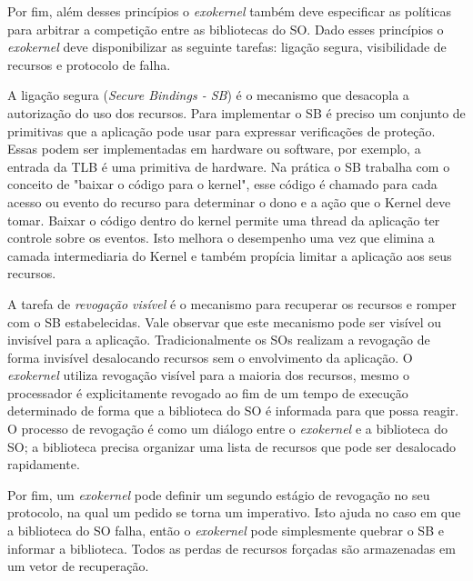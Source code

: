 Por fim, além desses princípios o \emph{exokernel} também deve especificar as
políticas para arbitrar a competição entre as bibliotecas do SO. Dado esses
princípios o \emph{exokernel} deve disponibilizar as seguinte tarefas: ligação
segura, visibilidade de recursos e protocolo de falha.

A ligação segura (\emph{Secure Bindings - SB}) é o mecanismo que desacopla a
autorização do uso dos recursos. Para implementar o SB é preciso um conjunto de
primitivas que a aplicação pode usar para expressar verificações de proteção.
Essas podem ser implementadas em hardware ou software, por exemplo, a entrada
da TLB é uma primitiva de hardware. Na prática o SB trabalha com o conceito de
"baixar o código para o kernel", esse código é chamado para cada acesso ou
evento do recurso para determinar o dono e a ação que o Kernel deve tomar.
Baixar o código dentro do kernel permite uma thread da aplicação ter controle
sobre os eventos. Isto melhora o desempenho uma vez que elimina a camada
intermediaria do Kernel e também propícia limitar a aplicação aos seus
recursos.

A tarefa de \emph{revogação visível} é o mecanismo para recuperar os recursos
e romper com o SB estabelecidas. Vale observar que este mecanismo pode ser
visível ou invisível para a aplicação. Tradicionalmente os SOs realizam a
revogação de forma invisível desalocando recursos sem o envolvimento da
aplicação. O \emph{exokernel} utiliza revogação visível para a maioria dos
recursos, mesmo o processador é explicitamente revogado ao fim de um tempo de
execução determinado de forma que a biblioteca do SO é informada para que possa
reagir. O processo de revogação é como um diálogo entre o \emph{exokernel} e a
biblioteca do SO; a biblioteca precisa organizar uma lista de recursos que pode
ser desalocado rapidamente.

Por fim, um \emph{exokernel} pode definir um segundo estágio de revogação no
seu protocolo, na qual um pedido se torna um imperativo. Isto ajuda no caso em
que a biblioteca do SO falha, então o \emph{exokernel} pode simplesmente
quebrar o SB e informar a biblioteca. Todos as perdas de recursos forçadas são
armazenadas em um vetor de recuperação.


% 
